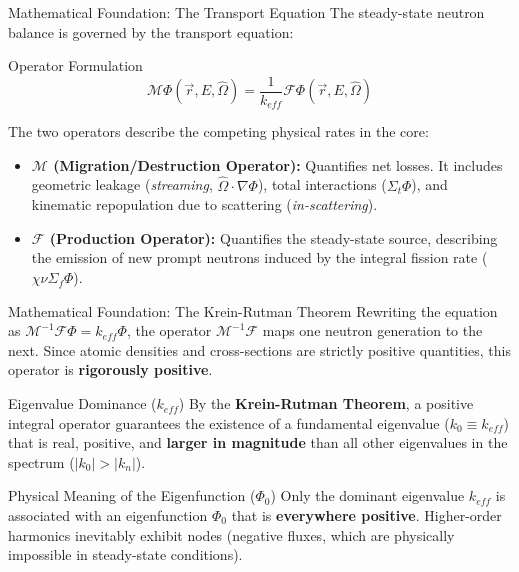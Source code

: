 \documentclass[aspectratio=169]{beamer}
\begin{document}
\begin{frame}{Mathematical Foundation: The Transport Equation}
The steady-state neutron balance is governed by the transport equation:

\begin{alertblock}{Operator Formulation}
\begin{equation*}
\mathcal{M} \Phi(\vec{r}, E, \hat{\Omega}) = \frac{1}{k_{eff}} \mathcal{F} \Phi(\vec{r}, E, \hat{\Omega})
\end{equation*}
\end{alertblock}

The two operators describe the competing physical rates in the core:

\begin{itemize}
\item \textbf{$\mathcal{M}$ (Migration/Destruction Operator):} Quantifies net losses. It includes geometric leakage (\textit{streaming}, $\hat{\Omega} \cdot \nabla \Phi$), total interactions ($\Sigma_t \Phi$), and kinematic repopulation due to scattering (\textit{in-scattering}).
\item \textbf{$\mathcal{F}$ (Production Operator):} Quantifies the steady-state source, describing the emission of new prompt neutrons induced by the integral fission rate ($\chi \nu \Sigma_f \Phi$).
\end{itemize}
\end{frame}

\begin{frame}{Mathematical Foundation: The Krein-Rutman Theorem}
Rewriting the equation as $\mathcal{M}^{-1}\mathcal{F} \Phi = k_{eff} \Phi$, the operator $\mathcal{M}^{-1}\mathcal{F}$ maps one neutron generation to the next. Since atomic densities and cross-sections are strictly positive quantities, this operator is \textbf{rigorously positive}.

\begin{block}{Eigenvalue Dominance ($k_{eff}$)}
By the \textbf{Krein-Rutman Theorem}, a positive integral operator guarantees the existence of a fundamental eigenvalue ($k_0 \equiv k_{eff}$) that is real, positive, and \textbf{larger in magnitude} than all other eigenvalues in the spectrum ($|k_0| > |k_n|$).
\end{block}

\begin{alertblock}{Physical Meaning of the Eigenfunction ($\Phi_0$)}
Only the dominant eigenvalue $k_{eff}$ is associated with an eigenfunction $\Phi_0$ that is \textbf{everywhere positive}. Higher-order harmonics inevitably exhibit nodes (negative fluxes, which are physically impossible in steady-state conditions).
\end{alertblock}
\end{frame}
\end{document}
